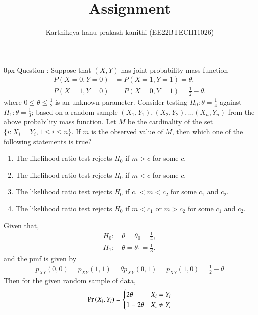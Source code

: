 \documentclass[article]{IEEEtran}
\theoremstyle{remark}
\begin{document}
\let\vec\mathbf


\title{
Assignment
}
\author{ Karthikeya hanu prakash kanithi (EE22BTECH11026)}
\maketitle
\parindent0px
\vspace{3cm}
Question : Suppose that $(X, Y)$ has joint probability mass function
\begin{align}
P(X = 0, Y = 0) &= P(X = 1, Y = 1) = \theta, \\
P(X = 1, Y = 0) &= P(X = 0, Y = 1) = \frac{1}{2} - \theta.
\end{align}
where $0 \le \theta \le \frac{1}{2}$ is an unknown parameter. Consider testing $H_0 : \theta = \frac{1}{4}$ against $H_1 : \theta = \frac{1}{3}$; based on a random sample ${(X_1 , Y_1 ), (X_2 , Y_2 ), \ldots (X_n , Y_n )}$ from the above probability mass function. Let $M$ be the cardinality of the set $\{i: X_i = Y_i , 1 \le i\le n\}$. If $m$ is the observed value of $M$, then which one of the following statements is true?
\begin{enumerate}
\item The likelihood ratio test rejects $H_0$ if $m > c$ for some $c$.
\item The likelihood ratio test rejects $H_0$ if $m < c$ for some $c$.
\item The likelihood ratio test rejects $H_0$ if $c_1 < m < c_2$ for some $c_1$ and $c_2$.
\item The likelihood ratio test rejects $H_0$ if $m < c_1$ or $m > c_2$ for some $c_1$ and $c_2$.
\end{enumerate}
\solution 
Given that,
\begin{align}
	H_0 : \quad \theta = \theta_0 = \frac{1}{4},\\
	H_1 : \quad \theta = \theta_1 = \frac{1}{3}.
\end{align}
and the pmf is given by 
\begin{align}
	p_{XY}(0,0) = p_{XY}(1,1) = \theta 
	p_{XY}(0,1) = p_{XY}(1,0) = \frac{1}{2} - \theta 
\end{align}
Then for the given random sample of data, 
\begin{align}
    \Pr\left(X_i, Y_i\right) &= 
    \begin{cases}
        2\theta &  X_i=Y_i  \\
        1 - 2\theta & X_i\ne Y_i
    \end{cases} \\
\end{align}
\end{document}
